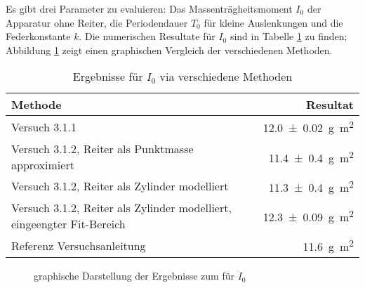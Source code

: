 Es gibt  drei Parameter  zu evaluieren: Das Massentr\"agheitsmoment  $I_0$ der
Apparatur ohne Reiter,  die Periodendauer $T_0$ f\"ur  kleine Auslenkungen und
die Federkonstante $k$. Die numerischen Resultate  f\"ur $I_0$ sind in Tabelle
\ref{tab:resultsI0}  zu  finden;  Abbildung  \ref{fig:resultsI0}  zeigt  einen
graphischen Vergleich der verschiedenen Methoden.

\begin{table}[h!]
    \centering
    \caption{Ergebnisse f\"ur $I_0$ via verschiedene Methoden}
    \label{tab:resultsI0}
    \begin{tabular}{p{70mm}r}
        \toprule
        Methode                                                                 & Resultat \\
        \midrule
        Versuch 3.1.1                                                           & \SI{12.0 \pm 0.02}{\gram\meter\squared} \\
        Versuch 3.1.2, Reiter als Punktmasse approximiert                       & \SI{11.4 \pm 0.4}{\gram\meter\squared} \\
        Versuch 3.1.2, Reiter als Zylinder modelliert                           & \SI{11.3 \pm 0.4}{\gram\meter\squared} \\
        Versuch 3.1.2, Reiter als Zylinder modelliert, eingeengter Fit-Bereich  & \SI{12.3 \pm 0.09}{\gram\meter\squared} \\
        Referenz Versuchsanleitung                                              & \SI{11.6}{\gram\meter\squared} \\
        \bottomrule
    \end{tabular}
\end{table}

\begin{figure}[ht!]
\centering
{}
\caption{graphische Darstellung der Ergebnisse zum f\"ur $I_0$}
\label{fig:resultsI0}
\end{figure}

